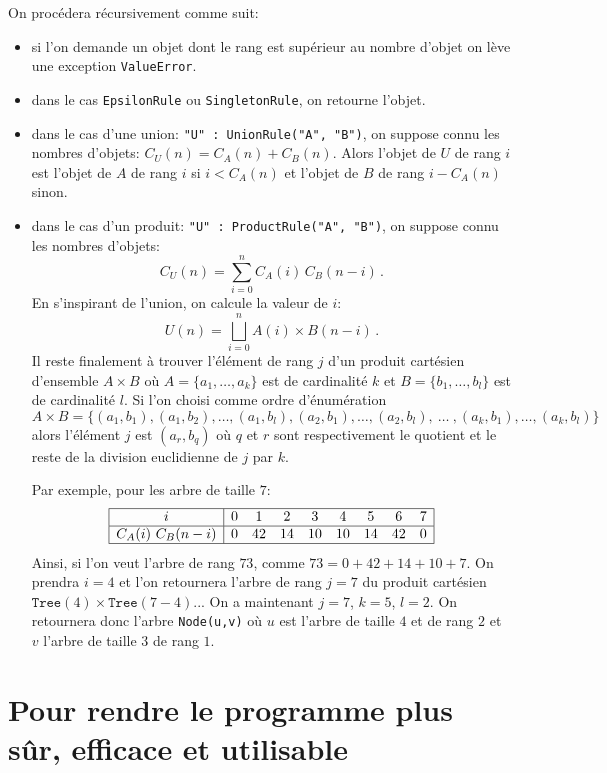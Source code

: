 \documentclass[11pt]{article}
\begin{document}
On procédera récursivement comme suit:
\begin{itemize}
\item si l'on demande un objet dont le rang est supérieur au nombre d'objet on
  lève une exception \texttt{ValueError}.
\item dans le cas \texttt{EpsilonRule} ou \texttt{SingletonRule}, on retourne
  l'objet.
\item dans le cas d'une union: \texttt{"U" : UnionRule("A", "B")}, on suppose
  connu les nombres d'objets: $C_U(n) = C_A(n) + C_B(n)$. Alors l'objet de $U$
  de rang $i$ est l'objet de $A$ de rang $i$ si $i<C_A(n)$ et l'objet de $B$
  de rang $i-C_A(n)$ sinon.
\item dans le cas d'un produit: \texttt{"U" : ProductRule("A", "B")}, on suppose
  connu les nombres d'objets:
  $$
  C_U(n) = \sum_{i=0}^n C_A(i)\,C_B(n-i)\,.
  $$
  En s'inspirant de l'union, on calcule la valeur de $i$:
  $$
  U(n) = \bigsqcup_{i=0}^n A(i) \times B(n-i)\,.
  $$
  Il reste finalement à trouver l'élément de rang $j$ d'un produit cartésien
  d'ensemble $A\times B$ où $A=\{a_1,\dots,a_k\}$ est de cardinalité $k$ et
  $B=\{b_1,\dots,b_l\}$ est de cardinalité $l$. Si l'on choisi comme ordre
  d'énumération
  $$
  A\times B =\{(a_1, b_1), (a_1, b_2), \dots, (a_1, b_l),
               (a_2, b_1), \dots, (a_2, b_l),
               \ \dots\ ,
               (a_k, b_1), \dots, (a_k, b_l)\}
  $$
  alors l'élément $j$ est $(a_{r}, b_{q})$ où $q$ et $r$ sont respectivement
  le quotient et le reste de la division euclidienne de $j$ par $k$.

  Par exemple, pour les arbre de taille $7$:
  $$
  \begin{array}{|c|cccccccc|}
    \hline
    i           & 0&  1&  2&  3&  4&  5&  6& 7\\
    \hline
    C_A(i)\ C_B(n-i)  & 0& 42& 14& 10& 10& 14& 42& 0\\
    \hline
  \end{array}
  $$
  Ainsi, si l'on veut l'arbre de rang $73$, comme $73 = 0+42+14+10+7$. On
  prendra $i=4$ et l'on retournera l'arbre de rang $j=7$ du produit cartésien
  $\texttt{Tree}(4) \times \texttt{Tree}(7-4)$...  On a maintenant $j=7$,
  $k=5$, $l=2$. On retournera donc l'arbre \texttt{Node(u,v)} où $u$ est
  l'arbre de taille $4$ et de rang $2$ et $v$ l'arbre de taille $3$ de rang
  $1$.
\end{itemize}

\section{Pour rendre le programme plus sûr, efficace et utilisable}
\end{document}

